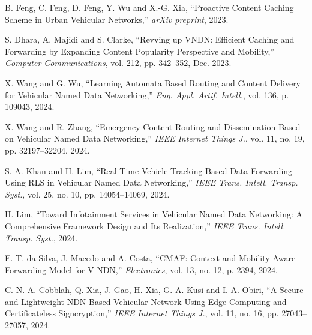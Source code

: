

 B. Feng, C. Feng, D. Feng, Y. Wu and X.-G. Xia, ``Proactive Content Caching Scheme in Urban Vehicular Networks,'' \emph{arXiv preprint}, 2023.

 S. Dhara, A. Majidi and S. Clarke, ``Revving up VNDN: Efficient Caching and Forwarding by Expanding Content Popularity Perspective and Mobility,'' \emph{Computer Communications}, vol. 212, pp. 342--352, Dec. 2023.

 X. Wang and G. Wu, ``Learning Automata Based Routing and Content Delivery for Vehicular Named Data Networking,'' \emph{Eng. Appl. Artif. Intell.}, vol. 136, p. 109043, 2024.

 X. Wang and R. Zhang, ``Emergency Content Routing and Dissemination Based on Vehicular Named Data Networking,'' \emph{IEEE Internet Things J.}, vol. 11, no. 19, pp. 32197--32204, 2024.

 S. A. Khan and H. Lim, ``Real-Time Vehicle Tracking-Based Data Forwarding Using RLS in Vehicular Named Data Networking,'' \emph{IEEE Trans. Intell. Transp. Syst.}, vol. 25, no. 10, pp. 14054--14069, 2024.

 H. Lim, ``Toward Infotainment Services in Vehicular Named Data Networking: A Comprehensive Framework Design and Its Realization,'' \emph{IEEE Trans. Intell. Transp. Syst.}, 2024.

 E. T. da Silva, J. Macedo and A. Costa, ``CMAF: Context and Mobility-Aware Forwarding Model for V-NDN,'' \emph{Electronics}, vol. 13, no. 12, p. 2394, 2024.

 C. N. A. Cobblah, Q. Xia, J. Gao, H. Xia, G. A. Kusi and I. A. Obiri, ``A Secure and Lightweight NDN-Based Vehicular Network Using Edge Computing and Certificateless Signcryption,'' \emph{IEEE Internet Things J.}, vol. 11, no. 16, pp. 27043--27057, 2024.

